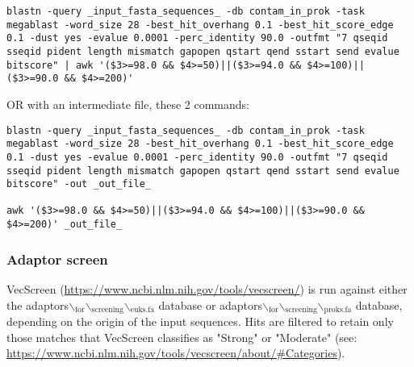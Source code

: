 \documentclass[11pt]{article}
\begin{document}
\begin{enumerate}
\begin{enumerate}
\begin{verbatim}
blastn -query _input_fasta_sequences_ -db contam_in_prok -task megablast -word_size 28 -best_hit_overhang 0.1 -best_hit_score_edge 0.1 -dust yes -evalue 0.0001 -perc_identity 90.0 -outfmt "7 qseqid sseqid pident length mismatch gapopen qstart qend sstart send evalue bitscore" | awk '($3>=98.0 && $4>=50)||($3>=94.0 && $4>=100)||($3>=90.0 && $4>=200)'
\end{verbatim}
\end{enumerate}

OR with an intermediate file, these 2 commands:

\begin{verbatim}
blastn -query _input_fasta_sequences_ -db contam_in_prok -task megablast -word_size 28 -best_hit_overhang 0.1 -best_hit_score_edge 0.1 -dust yes -evalue 0.0001 -perc_identity 90.0 -outfmt "7 qseqid sseqid pident length mismatch gapopen qstart qend sstart send evalue bitscore" -out _out_file_

awk '($3>=98.0 && $4>=50)||($3>=94.0 && $4>=100)||($3>=90.0 && $4>=200)' _out_file_
\end{verbatim}
\end{enumerate}

\subsubsection{Adaptor screen}
\label{sec:orgf79e66f}


VecScreen (\url{https://www.ncbi.nlm.nih.gov/tools/vecscreen/}) is run against
either the adaptors$\backslash$\(_{\text{for}}\)$\backslash$\(_{\text{screening}}\)$\backslash$\(_{\text{euks.fa}}\) database or
adaptors$\backslash$\(_{\text{for}}\)$\backslash$\(_{\text{screening}}\)$\backslash$\(_{\text{proks.fa}}\) database, depending on the origin of
the input sequences. Hits are filtered to retain only those matches that
VecScreen classifies as "Strong" or "Moderate" (see:
\url{https://www.ncbi.nlm.nih.gov/tools/vecscreen/about/\#Categories}).
\end{document}
